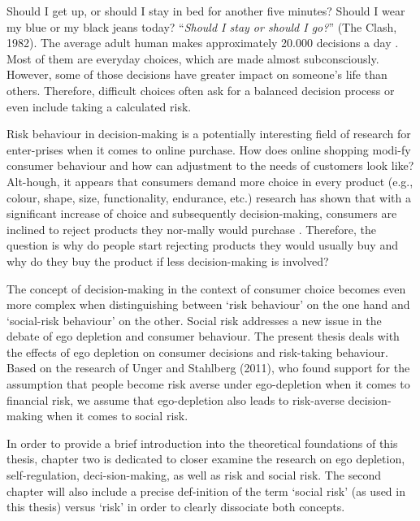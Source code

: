 \onehalfspacing
Should I get up, or should I stay in bed for another five minutes? Should I wear my blue or my black jeans today? “\emph{Should I stay or should I go?}” (The Clash, 1982). The average adult human makes approximately 20.000 decisions a day \parencite{toennemann2008}. Most of them are everyday choices, which are made almost subconsciously. However, some of those decisions have greater impact on someone’s life than others. Therefore, difficult choices often ask for a balanced decision process or even include taking a calculated risk.\par
Risk behaviour in decision-making is a potentially interesting field of research for enter-prises \parencite{baumeister2002yielding} when it comes to online purchase. How does online shopping modi-fy consumer behaviour and how can adjustment to the needs of customers look like? Alt-hough, it appears that consumers demand more choice in every product (e.g., colour, shape, size, functionality, endurance, etc.) research has shown that with a significant increase of choice and subsequently decision-making, consumers are inclined to reject products they nor-mally would purchase \parencite{greifeneder2010less,levav2010order}. Therefore, the question is why do people start rejecting products they would usually buy and why do they buy the product if less decision-making is involved?\par
The concept of decision-making in the context of consumer choice becomes even more complex when distinguishing between ‘risk behaviour’ on the one hand and ‘social-risk behaviour’ on the other. Social risk addresses a new issue in the debate of ego depletion and consumer behaviour. The present thesis deals with the effects of ego depletion on consumer decisions and risk-taking behaviour. Based on the research of Unger and Stahlberg (2011), who found support for the assumption that people become risk averse under ego-depletion when it comes to financial risk, we assume that ego-depletion also leads to risk-averse decision-making when it comes to social risk.\par
In order to provide a brief introduction into the theoretical foundations of this thesis, chapter two is dedicated to closer examine the research on ego depletion, self-regulation, deci-sion-making, as well as risk and social risk. The second chapter will also include a precise def-inition of the term ‘social risk’ (as used in this thesis) versus ‘risk’ in order to clearly dissociate both concepts. \par
